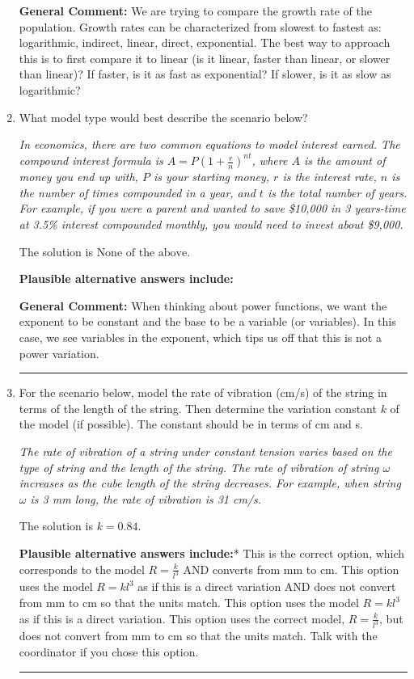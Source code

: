 \documentclass{extbook}[14pt]
\newcommand{\litem}[1]{\item #1

\rule{\textwidth}{0.4pt}}
\begin{document}
\begin{enumerate}
{\textbf{General Comment:} We are trying to compare the growth rate of the population. Growth rates can be characterized from slowest to fastest as: logarithmic, indirect, linear, direct, exponential. The best way to approach this is to first compare it to linear (is it linear, faster than linear, or slower than linear)? If faster, is it as fast as exponential? If slower, is it as slow as logarithmic?
}
\litem{
What model type would best describe the scenario below?

\begin{center}
    \textit{ In economics, there are two common equations to model interest earned. The compound interest formula is $A = P (1 + \frac{r}{n})^{nt}$, where $A$ is the amount of money you end up with, $P$ is your starting money, $r$ is the interest rate, $n$ is the number of times compounded in a year, and $t$ is the total number of years. For example, if you were a parent and wanted to save \$10,000 in 3 years-time at 3.5\% interest compounded monthly, you would need to invest about \$9,000. }
\end{center}
The solution is \( \text{None of the above} \).\begin{enumerate}[label=\Alph*.]
\textbf{Plausible alternative answers include:}



\end{enumerate}

\textbf{General Comment:} When thinking about power functions, we want the exponent to be constant and the base to be a variable (or variables). In this case, we see variables in the exponent, which tips us off that this is not a power variation.
}
\litem{
For the scenario below, model the rate of vibration (cm/s) of the string in terms of the length of the string. Then determine the variation constant $k$ of the model (if possible). The constant should be in terms of cm and s.

\begin{center}
    \textit{ The rate of vibration of a string under constant tension varies based on the type of string and the length of the string. The rate of vibration of string $\omega$ increases as the cube length of the string decreases. For example, when string $\omega$ is 3 mm long, the rate of vibration is 31 cm/s. }
\end{center}
The solution is \( k = 0.84 \).\begin{enumerate}[label=\Alph*.]
\textbf{Plausible alternative answers include:}* This is the correct option, which corresponds to the model $R = \frac{k}{l^{3}}$ AND converts from mm to cm.
This option uses the model $R = kl^{3}$ as if this is a direct variation AND does not convert from mm to cm so that the units match.
This option uses the model $R = kl^{3}$ as if this is a direct variation.
This option uses the correct model, $R = \frac{k}{l^{3}}$, but does not convert from mm to cm so that the units match.
Talk with the coordinator if you chose this option.
\end{enumerate}

}
\end{enumerate}
\end{document}
